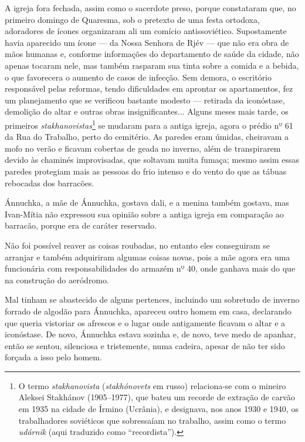 A igreja fora fechada, assim como o sacerdote preso, porque constataram
que, no primeiro domingo de Quaresma, sob o pretexto de uma festa
ortodoxa, adoradores de ícones organizaram ali um comício
antissoviético. Supostamente havia aparecido um ícone --- da Nossa
Senhora de Rjév --- que não era obra de mãos humanas e, conforme
informações do departamento de saúde da cidade, não apenas tocaram nele,
mas também rasparam sua tinta sobre a comida e a bebida, o que
favorecera o aumento de casos de infecção. Sem demora, o escritório
responsável pelas reformas, tendo dificuldades em aprontar os
apartamentos, fez um planejamento que se verificou bastante modesto ---
retirada da iconóstase, demolição do altar e outras obras
insignificantes... Alguns meses mais tarde, os primeiros
\emph{stakhanovistas}\footnote{O termo \emph{stakhanovista}
  (\emph{stakhónovets} em russo) relaciona-se com o mineiro Aleksei
  Stakhánov (1905\emph{--}1977), que bateu um recorde de extração de
  carvão em 1935 na cidade de Írmino (Ucrânia), e designava, nos anos
  1930 e 1940, os trabalhadores soviéticos que sobressaíam no trabalho,
  assim como o termo \emph{udárnik} (aqui traduzido como
  ``recordista'').} se mudaram para a antiga igreja, agora o prédio nº
61 da Rua do Trabalho, perto do cemitério. As paredes eram úmidas,
cheiravam a mofo no verão e ficavam cobertas de geada no inverno, além
de transpirarem devido às chaminés improvisadas, que soltavam muita
fumaça; mesmo assim essas paredes protegiam mais as pessoas do frio
intenso e do vento do que as tábuas rebocadas dos barracões.

Ánnuchka, a mãe de Ánnuchka, gostava dali, e a menina também gostava,
mas Ivan-Mítia não expressou sua opinião sobre a antiga igreja em
comparação ao barracão, porque era de caráter reservado.

Não foi possível reaver as coisas roubadas, no entanto eles conseguiram
se arranjar e também adquiriram algumas coisas novas, pois a mãe agora
era uma funcionária com responsabilidades do armazém nº 40, onde ganhava
mais do que na construção do aeródromo.

Mal tinham se abastecido de alguns pertences, incluindo um sobretudo de
inverno forrado de algodão para Ánnuchka, apareceu outro homem em casa,
declarando que queria vistoriar os afrescos e o lugar onde antigamente
ficavam o altar e a iconóstase. De novo, Ánnuchka estava sozinha e, de
novo, teve medo de apanhar, então se sentou, silenciosa e tristemente,
numa cadeira, apesar de não ter sido forçada a isso pelo homem.

